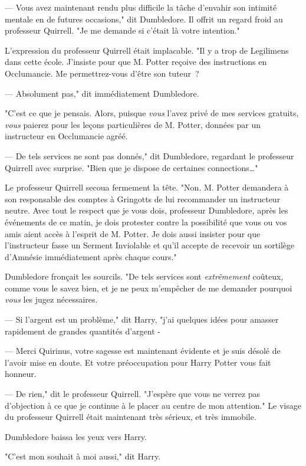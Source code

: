 --- Vous avez maintenant rendu plus difficile la tâche d'envahir son intimité mentale en de futures occasions," dit Dumbledore. Il offrit un regard froid au professeur Quirrell. "Je me demande si c'était là votre intention."

L'expression du professeur Quirrell était implacable. "Il y a trop de Legilimens dans cette école. J'insiste pour que M. Potter reçoive des instructions en Occlumancie. Me permettrez-vous d'être son tuteur~?

--- Absolument pas," dit immédiatement Dumbledore.

"C'est ce que je pensais. Alors, puisque \emph{vous} l'avez privé de mes services gratuits, \emph{vous} paierez pour les leçons particulières de M. Potter, données par un instructeur en Occlumancie agréé.

--- De tels services ne sont pas donnés," dit Dumbledore, regardant le professeur Quirrell avec surprise. "Bien que je dispose de certaines connections…"

Le professeur Quirrell secoua fermement la tête. "Non. M. Potter demandera à son responsable des comptes à Gringotts de lui recommander un instructeur neutre. Avec tout le respect que je vous dois, professeur Dumbledore, après les événements de ce matin, je dois protester contre la possibilité que vous ou vos amis aient accès à l'esprit de M. Potter. Je dois aussi insister pour que l'instructeur fasse un Serment Inviolable et qu'il accepte de recevoir un sortilège d'Amnésie immédiatement après chaque cours."

Dumbledore fronçait les sourcils. "De tels services sont \emph{extrêmement} coûteux, comme vous le savez bien, et je ne peux m'empêcher de me demander pourquoi \emph{vous} les jugez nécessaires.

--- Si l'argent est un problème," dit Harry, "j'ai quelques idées pour amasser rapidement de grandes quantités d'argent -

--- Merci Quirinus, votre sagesse est maintenant évidente et je suis désolé de l'avoir mise en doute. Et votre préoccupation pour Harry Potter vous fait honneur.

--- De rien," dit le professeur Quirrell. "J'espère que vous ne verrez pas d'objection à ce que je continue à le placer au centre de mon attention." Le visage du professeur Quirrell était maintenant très sérieux, et très immobile.

Dumbledore baissa les yeux vers Harry.

"C'est mon souhait à moi aussi," dit Harry.

